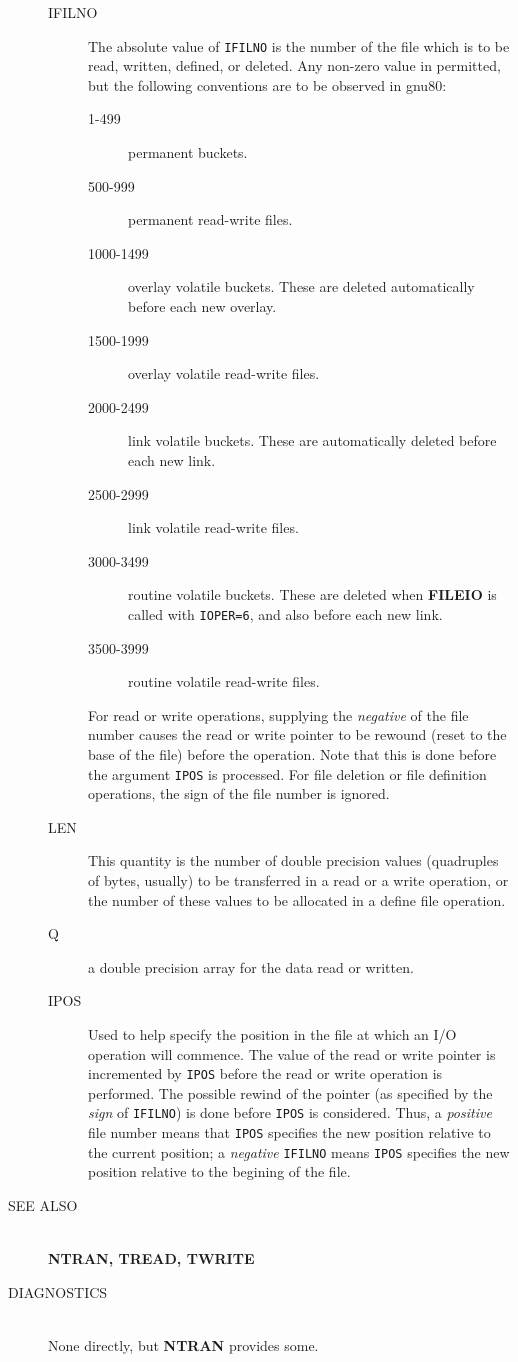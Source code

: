 \begin{description}
\begin{description}
\item[IFILNO] The absolute value of {\tt IFILNO} is the number  of  the  file
which is to be read, written, defined, or deleted.  Any
non-zero value in permitted, but the following  
conventions are to be observed in gnu80:
\begin{description} 
\item[1-499]  permanent buckets.
\item[500-999] permanent read-write files.
\item[1000-1499]  overlay volatile buckets.  These are  
deleted automatically before each new overlay.
\item[1500-1999]  overlay volatile read-write files.
\item[2000-2499]  link volatile buckets.  These  are  
automatically deleted before each new link.
\item[2500-2999]  link volatile read-write files.
\item[3000-3499]  routine volatile buckets.  These are  
deleted when {\bf FILEIO} is called with {\tt IOPER=6},
and also before each new link.
\item[3500-3999]  routine volatile read-write files.
\end{description} 
For read or write operations, supplying the {\em negative}
of  the  file number causes the read or write 
pointer to be rewound (reset to the base of the file) 
before  the operation. Note that this is done before the
argument {\tt IPOS} is processed.  For file deletion or file
definition operations, the sign of the file number is
ignored.
\item[LEN]   This quantity is the number of double precision values
(quadruples of bytes, usually)  to be transferred in a read or a write 
operation, or the number of these values to be allocated
in a define file operation.
\item[Q] a double precision array for the data read or written.
\item[IPOS] Used to help specify the position in the   file
at  which  an I/O operation will commence. The value of
the read or write pointer is incremented by {\tt IPOS} before
the read or write operation is performed. The possible
rewind of the pointer (as specified by  the  {\em sign}  of
{\tt IFILNO}) is done before {\tt IPOS} is considered.  Thus, a 
{\em positive} file number means that {\tt IPOS} specifies  the  new
position relative to the current position; a {\em negative}
{\tt IFILNO} means {\tt IPOS} specifies the new  position relative
to the begining of the file.
\end{description}
\item[SEE ALSO] \ \\
{\bf NTRAN, TREAD, TWRITE}
\item[DIAGNOSTICS] \ \\
None directly, but {\bf NTRAN} provides some.
\end{description}

